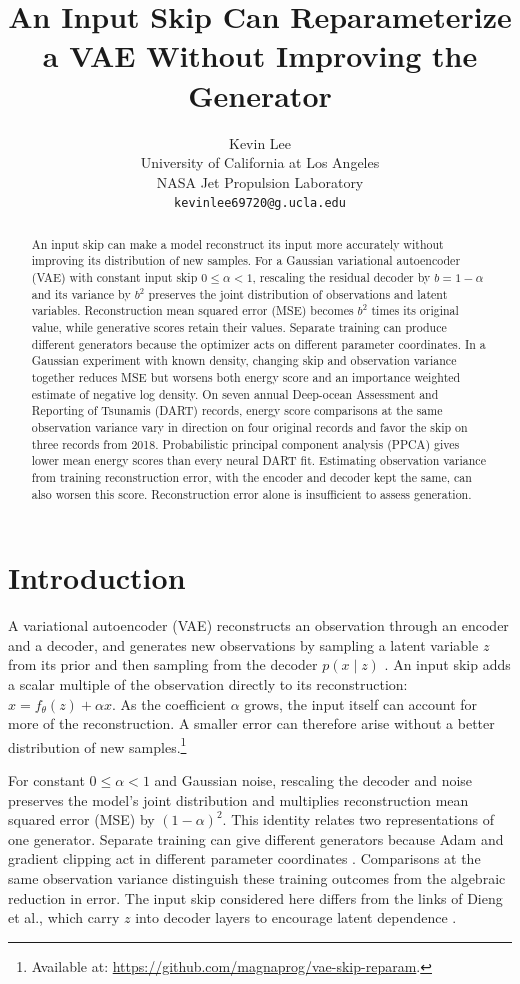 \documentclass{article}
\title{An Input Skip Can Reparameterize a VAE Without Improving the Generator}
\author{%
 Kevin Lee{\hypersetup{pdfborder={0 0 0}}\orcidlink{0009-0004-0388-9260}} \\
 [4pt] University of California at Los Angeles \\
 NASA Jet Propulsion Laboratory \\
 \texttt{kevinlee69720@g.ucla.edu}
}
\begin{document}
\maketitle

\begin{abstract}
An input skip can make a model reconstruct its input more accurately without improving its distribution of new samples. For a Gaussian variational autoencoder (VAE) with constant input skip $0\leq\alpha<1$, rescaling the residual decoder by $b=1-\alpha$ and its variance by $b^2$ preserves the joint distribution of observations and latent variables. Reconstruction mean squared error (MSE) becomes $b^2$ times its original value, while generative scores retain their values. Separate training can produce different generators because the optimizer acts on different parameter coordinates. In a Gaussian experiment with known density, changing skip and observation variance together reduces MSE but worsens both energy score and an importance weighted estimate of negative log density. On seven annual \mbox{Deep-ocean} Assessment and Reporting of Tsunamis (DART) records, energy score comparisons at the same observation variance vary in direction on four original records and favor the skip on three records from 2018. Probabilistic principal component analysis (PPCA) gives lower mean energy scores than every neural DART fit. Estimating observation variance from training reconstruction error, with the encoder and decoder kept the same, can also worsen this score. Reconstruction error alone is insufficient to assess generation.
\end{abstract}

\section{Introduction}
A variational autoencoder (VAE) reconstructs an observation through an encoder and a decoder, and generates new observations by sampling a latent variable $z$ from its prior and then sampling from the decoder $p(x\mid z)$ \citep{KingmaWelling2014AutoEncodingVB}. An input skip adds a scalar multiple of the observation directly to its reconstruction: $\hat x=f_\theta(z)+\alpha x$. As the coefficient $\alpha$ grows, the input itself can account for more of the reconstruction. A smaller error can therefore arise without a better distribution of new samples.\footnote{Available at: \url{https://github.com/magnaprog/vae-skip-reparam}.}

For constant $0\leq\alpha<1$ and Gaussian noise, rescaling the decoder and noise preserves the model's joint distribution and multiplies reconstruction mean squared error (MSE) by $(1-\alpha)^2$. This identity relates two representations of one generator. Separate training can give different generators because Adam and gradient clipping act in different parameter coordinates \citep{KingmaBa2015Adam,Dinh2017SharpMinima}. Comparisons at the same observation variance distinguish these training outcomes from the algebraic reduction in error. The input skip considered here differs from the links of Dieng et al., which carry $z$ into decoder layers to encourage latent dependence \citep{Dieng2019SkipVAE}.
\end{document}

